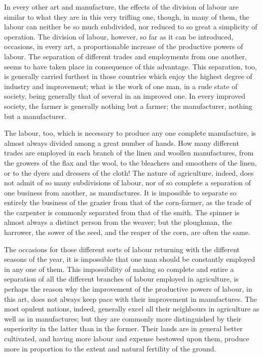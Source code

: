 In every other art and manufacture, the effects of the division of labour are similar to what they are in this very trifling one, though, in many of them, the labour can neither be so much subdivided, nor reduced to so great a simplicity of operation. The division of labour, however, so far as it can be introduced, occasions, in every art, a proportionable increase of the productive powers of labour. The separation of different trades and employments from one another, seems to have taken place in consequence of this advantage. This separation, too, is generally carried furthest in those countries which enjoy the highest degree of industry and improvement; what is the work of one man, in a rude state of society, being generally that of several in an improved one. In every improved society, the farmer is generally nothing but a farmer; the manufacturer, nothing but a manufacturer.\par

The labour, too, which is necessary to produce any one complete manufacture, is almost always divided among a great number of hands. How many different trades are employed in each branch of the linen and woollen manufactures, from the growers of the flax and the wool, to the bleachers and smoothers of the linen, or to the dyers and dressers of the cloth! The nature of agriculture, indeed, does not admit of so many subdivisions of labour, nor of so complete a separation of one business from another, as manufactures. It is impossible to separate so entirely the business of the grazier from that of the corn-farmer, as the trade of the carpenter is commonly separated from that of the smith. The spinner is almost always a distinct person from the weaver; but the ploughman, the harrower, the sower of the seed, and the reaper of the corn, are often the same.\par

The occasions for those different sorts of labour returning with the different seasons of the year, it is impossible that one man should be constantly employed in any one of them. This impossibility of making so complete and entire a separation of all the different branches of labour employed in agriculture, is perhaps the reason why the improvement of the productive powers of labour, in this art, does not always keep pace with their improvement in manufactures. The most opulent nations, indeed, generally excel all their neighbours in agriculture as well as in manufactures; but they are commonly more distinguished by their superiority in the latter than in the former. Their lands are in general better cultivated, and having more labour and expense bestowed upon them, produce more in proportion to the extent and natural fertility of the ground.\par

